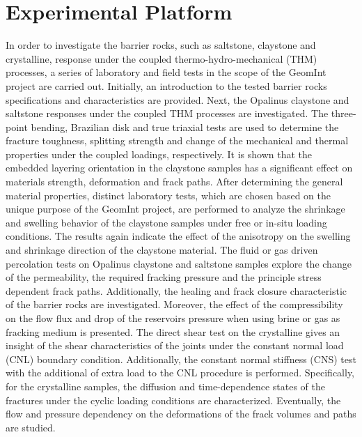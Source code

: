 \chapter{Experimental Platform}
\label{cha:exp}

In order to investigate the barrier rocks, such as saltstone, claystone and crystalline, response under the coupled thermo-hydro-mechanical (THM) processes, a series of laboratory and field tests in the scope of the GeomInt project are carried out. Initially, an introduction to the tested barrier rocks specifications and characteristics are provided. Next, the Opalinus claystone and saltstone responses under the coupled THM processes are investigated. The three-point bending, Brazilian disk and true triaxial tests are used to determine the fracture toughness, splitting strength and change of the mechanical and thermal properties under the coupled loadings, respectively. It is shown that the embedded layering orientation in the claystone samples has a significant effect on materials strength, deformation and frack paths. After determining the general material properties, distinct laboratory tests, which are chosen based on the unique purpose of the GeomInt project, are performed to analyze the shrinkage and swelling behavior of the claystone samples under free or in-situ loading conditions.  The results again indicate the effect of the anisotropy on the swelling and shrinkage direction of the claystone material. The fluid or gas driven percolation tests on Opalinus claystone and saltstone samples explore the change of the permeability, the required fracking pressure and the principle stress dependent frack paths. Additionally, the healing and frack closure characteristic of the barrier rocks are investigated. Moreover, the effect of the compressibility on the flow flux and drop of the reservoirs pressure when using brine or gas as fracking medium is presented. The direct shear test on the crystalline gives an insight of the shear characteristics of the joints under the constant normal load (CNL) boundary condition. Additionally, the constant normal stiffness (CNS) test with the additional of extra load to the CNL procedure is performed. Specifically, for the crystalline samples, the diffusion and time-dependence states of the fractures under the cyclic loading conditions are characterized. Eventually, the flow and pressure dependency on the deformations of the frack volumes and paths are studied.

